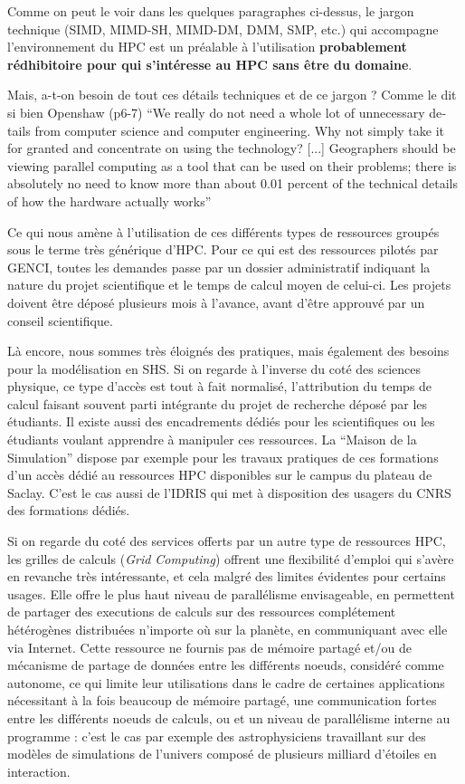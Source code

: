 Comme on peut le voir dans les quelques paragraphes ci-dessus, le jargon technique (SIMD, MIMD-SH, MIMD-DM, DMM, SMP, etc.) qui accompagne l'environnement du HPC est un préalable à l'utilisation \textbf{probablement rédhibitoire pour qui s'intéresse au HPC sans être du domaine}.

Mais, a-t-on besoin de tout ces détails techniques et de ce jargon ? Comme le dit si bien Openshaw (p6-7) \foreignquote{english}{We really do not need a whole lot of unnecessary details from computer science and computer engineering. Why not simply take it for granted and concentrate on using the technology? [...] Geographers should be viewing parallel computing as a tool that can be used on their problems; there is absolutely no need to know more than about 0.01 percent of the technical details of how the hardware actually works}

Ce qui nous amène à l'utilisation de ces différents types de ressources groupés sous le terme très générique d'HPC. Pour ce qui est des ressources pilotés par GENCI, toutes les demandes passe par un dossier administratif indiquant la nature du projet scientifique et le temps de calcul moyen de celui-ci. Les projets doivent être déposé plusieurs mois à l'avance, avant d'être approuvé par un conseil scientifique.

Là encore, nous sommes très éloignés des pratiques, mais également des besoins pour la modélisation en SHS. Si on regarde à l'inverse du coté des sciences physique, ce type d'accès est tout à fait normalisé, l'attribution du temps de calcul faisant souvent parti intégrante du projet de recherche déposé par les étudiants. Il existe aussi des encadrements dédiés pour les scientifiques ou les étudiants voulant apprendre à manipuler ces ressources. La \enquote{Maison de la Simulation} dispose par exemple pour les travaux pratiques de ces formations d'un accès dédié au ressources HPC disponibles sur le campus du plateau de Saclay. C'est le cas aussi de l'IDRIS qui met à disposition des usagers du CNRS des formations dédiés. 

Si on regarde du coté des services offerts par un autre type de ressources HPC, les grilles de calculs (\textit{Grid Computing}) offrent une flexibilité d'emploi qui s'avère en revanche très intéressante, et cela malgré des limites évidentes pour certains usages.
Elle offre le plus haut niveau de parallélisme envisageable, en permettent de partager des executions de calculs sur des ressources complétement hétérogènes distribuées n'importe où sur la planète, en communiquant avec elle via Internet. Cette ressource ne fournis pas de mémoire partagé et/ou de mécanisme de partage de données entre les différents noeuds, considéré comme autonome, ce qui limite leur utilisations dans le cadre de certaines applications nécessitant à la fois beaucoup de mémoire partagé, une communication fortes entre les différents noeuds de calculs, ou et un niveau de parallélisme interne au programme : c'est le cas par exemple des astrophysiciens travaillant sur des modèles de simulations de l'univers composé de plusieurs milliard d'étoiles en interaction.

